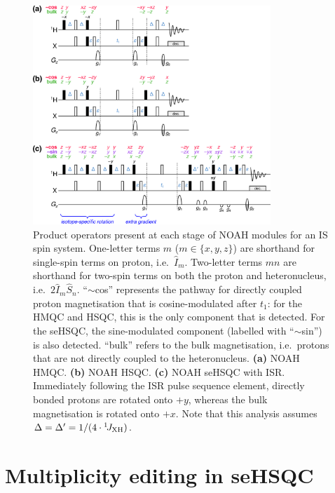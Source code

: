 \begin{figure}
    \centering
    \includegraphics[width=0.8\textwidth]{./figures/pprogs_prodop.png}
    \caption{
        Product operators present at each stage of NOAH modules for an IS spin system.
        One-letter terms $m$ ($m \in \{x, y, z\}$) are shorthand for single-spin terms on proton, i.e.\ $\hat{I}_m$.
        Two-letter terms $mn$ are shorthand for two-spin terms on both the proton and heteronucleus, i.e.\ $2\hat{I}_m\hat{S}_n$.
        ``$\sim$cos'' represents the pathway for directly coupled proton magnetisation that is cosine-modulated after $t_1$: for the HMQC and HSQC, this is the only component that is detected.
        For the seHSQC, the sine-modulated component (labelled with ``$\sim$sin'') is also detected.
        ``bulk'' refers to the bulk magnetisation, i.e.\ protons that are not directly coupled to the heteronucleus.
        \textbf{(a)} NOAH HMQC.
        \textbf{(b)} NOAH HSQC.
        \textbf{(c)} NOAH seHSQC with ISR.
        Immediately following the ISR pulse sequence element, directly bonded protons are rotated onto $+y$, whereas the bulk magnetisation is rotated onto $+x$.
        Note that this analysis assumes $\Delta = \Delta' = 1/(4\cdot\onejxh)$.
    }
    \label{fig:pprogs_prodop}
\end{figure}

\section{Multiplicity editing in seHSQC}

